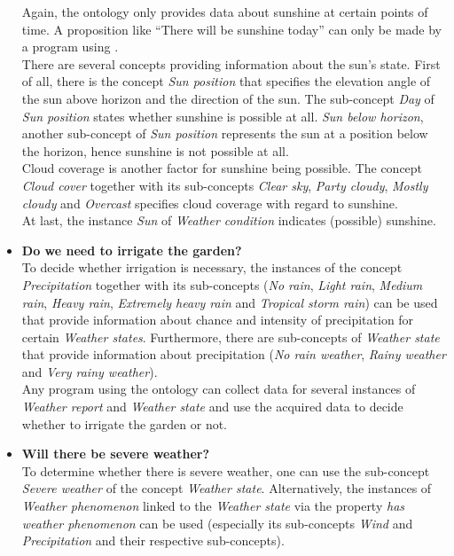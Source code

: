\begin{itemize}
    Again, the \thinkhomeweather ontology only provides data about sunshine at certain points of time. A proposition like ``There will be sunshine today'' can only be made by a program using \thinkhomeweather.\\
    There are several concepts providing information about the sun's state. First of all, there is the concept \emph{Sun position} that specifies the elevation angle of the sun above horizon and the direction of the sun. The sub-concept \emph{Day} of \emph{Sun position} states whether sunshine is possible at all. \emph{Sun below horizon}, another sub-concept of \emph{Sun position} represents the sun at a position below the horizon, hence sunshine is not possible at all.\\
    Cloud coverage is another factor for sunshine being possible. The concept \emph{Cloud cover} together with its sub-concepts \emph{Clear sky}, \emph{Party cloudy}, \emph{Mostly cloudy} and \emph{Overcast} specifies cloud coverage with regard to sunshine.\\
    At last, the instance \emph{Sun} of \emph{Weather condition} indicates (possible) sunshine.
  \item \textbf{Do we need to irrigate the garden?}\\
    To decide whether irrigation is necessary, the instances of the concept \emph{Precipitation} together with its sub-concepts (\emph{No rain}, \emph{Light rain}, \emph{Medium rain}, \emph{Heavy rain}, \emph{Extremely heavy rain} and \emph{Tropical storm rain}) can be used that provide information about chance and intensity of precipitation for certain \emph{Weather states}. Furthermore, there are sub-concepts of \emph{Weather state} that provide information about precipitation (\emph{No rain weather}, \emph{Rainy weather} and \emph{Very rainy weather}).\\
    Any program using the \thinkhomeweather ontology can collect data for several instances of \emph{Weather report} and \emph{Weather state} and use the acquired data to decide whether to irrigate the garden or not.
  \item \textbf{Will there be severe weather?}\\
    To determine whether there is severe weather, one can use the sub-concept \emph{Severe weather} of the concept \emph{Weather state}. Alternatively, the instances of \emph{Weather phenomenon} linked to the \emph{Weather state} via the property \emph{has weather phenomenon} can be used (especially its sub-concepts \emph{Wind} and \emph{Precipitation} and their respective sub-concepts).\\

\end{itemize}
